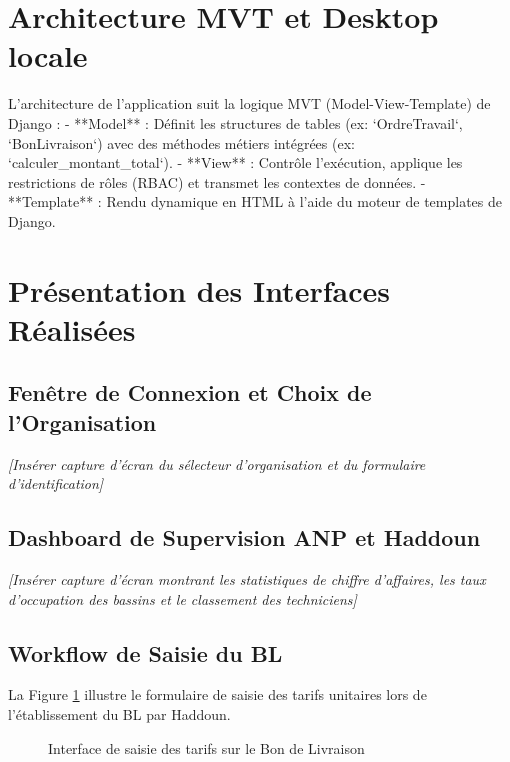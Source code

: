 \documentclass[12pt,a4paper,oneside]{report}
\begin{document}
\section{Architecture MVT et Desktop locale}
L'architecture de l'application suit la logique MVT (Model-View-Template) de Django :
- **Model** : Définit les structures de tables (ex: `OrdreTravail`, `BonLivraison`) avec des méthodes métiers intégrées (ex: `calculer_montant_total`).
- **View** : Contrôle l'exécution, applique les restrictions de rôles (RBAC) et transmet les contextes de données.
- **Template** : Rendu dynamique en HTML à l'aide du moteur de templates de Django.

\section{Présentation des Interfaces Réalisées}
\subsection{Fenêtre de Connexion et Choix de l'Organisation}
\emph{[Insérer capture d'écran du sélecteur d'organisation et du formulaire d'identification]}

\subsection{Dashboard de Supervision ANP et Haddoun}
\emph{[Insérer capture d'écran montrant les statistiques de chiffre d'affaires, les taux d'occupation des bassins et le classement des techniciens]}

\subsection{Workflow de Saisie du BL}
La Figure \ref{fig:screen_bl} illustre le formulaire de saisie des tarifs unitaires lors de l'établissement du BL par Haddoun.

\begin{figure}[H]
    \centering
    \color{gray}
    \caption{Interface de saisie des tarifs sur le Bon de Livraison}
    \label{fig:screen_bl}
\end{figure}
\end{document}
